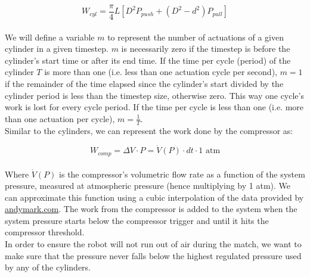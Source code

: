 \documentclass[a4paper]{article}
\begin{document}
	\begin{equation}
		W_{cyl} = \frac{\pi}{4} L \left[ D^2 P_{push} + \left( D^2 - d^2 \right) P_{pull} \right] 
	\end{equation}
	\\
	We will define a variable $ m $ to represent the number of actuations of a given cylinder in a given timestep. $ m $ is necessarily zero if the timestep is before the cylinder's start time or after its end time. If the time per cycle (period) of the cylinder $ T $ is more than one (i.e. less than one actuation cycle per second), $ m = 1 $ if the remainder of the time elapsed since the cylinder's start divided by the cylinder period is less than the timestep size, otherwise zero. This way one cycle's work is lost for every cycle period. If the time per cycle is less than one (i.e. more than one actuation per cycle), $ m = \frac{1}{T} $.\\
	
	Similar to the cylinders, we can represent the work done by the compressor as:
	
	\begin{equation}
		W_{comp} = \Delta V \cdot P = \dot{V}(P) \cdot dt \cdot 1 \text{ atm}
	\end{equation}
	\\
	Where $ \dot{V}(P) $ is the compressor's volumetric flow rate as a function of the system pressure, measured at atmospheric pressure (hence multiplying by 1 atm). We can approximate this function using a cubic interpolation of the data provided by \url{andymark.com}. The work from the compressor is added to the system when the system pressure starts below the compressor trigger and until it hits the compressor threshold. \\
	
	In order to ensure the robot will not run out of air during the match, we want to make sure that the pressure never falls below the highest regulated pressure used by any of the cylinders.
	
	
\end{document}
